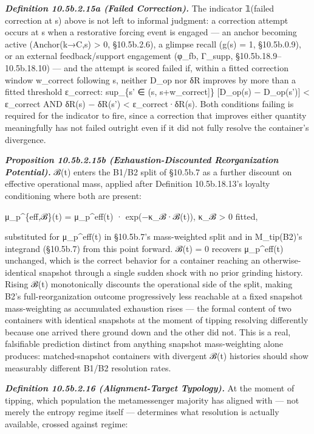 \documentclass[
]{article}
\begin{document}
\emph{\textbf{Definition 10.5b.2.15a (Failed Correction).}} The
indicator 𝟙(failed correction at s) above is not left to informal
judgment: a correction attempt occurs at s when a restorative forcing
event is engaged --- an anchor becoming active (Anchor(k→C,s)
\textgreater{} 0, §10.5b.2.6), a glimpse recall (g(s) = 1, §10.5b.0.9),
or an external feedback/support engagement (φ\_fb, Γ\_supp,
§10.5b.18.9--10.5b.18.10) --- and the attempt is scored failed if,
within a fitted correction window w\_correct following s, neither D\_op
nor δR improves by more than a fitted threshold ε\_correct: sup\_\{s' ∈
(s, s+w\_correct{]}\} {[}D\_op(s) − D\_op(s'){]} \textless{} ε\_correct
AND δR(s) − δR(s') \textless{} ε\_correct·δR(s). Both conditions failing
is required for the indicator to fire, since a correction that improves
either quantity meaningfully has not failed outright even if it did not
fully resolve the container's divergence.

\emph{\textbf{Proposition 10.5b.2.15b (Exhaustion-Discounted
Reorganization Potential).}} ℬ(t) enters the B1/B2 split of §10.5b.7 as
a further discount on effective operational mass, applied after
Definition 10.5b.18.13's loyalty conditioning where both are present:

μ\_p\^{}\{eff,ℬ\}(t) = μ\_p\^{}eff(t) · exp(−κ\_ℬ·ℬ(t)), κ\_ℬ
\textgreater{} 0 fitted,

substituted for μ\_p\^{}eff(t) in §10.5b.7's mass-weighted split and in
M\_tip(B2)'s integrand (§10.5b.7) from this point forward. ℬ(t) = 0
recovers μ\_p\^{}eff(t) unchanged, which is the correct behavior for a
container reaching an otherwise-identical snapshot through a single
sudden shock with no prior grinding history. Rising ℬ(t) monotonically
discounts the operational side of the split, making B2's
full-reorganization outcome progressively less reachable at a fixed
snapshot mass-weighting as accumulated exhaustion rises --- the formal
content of two containers with identical snapshots at the moment of
tipping resolving differently because one arrived there ground down and
the other did not. This is a real, falsifiable prediction distinct from
anything snapshot mass-weighting alone produces: matched-snapshot
containers with divergent ℬ(t) histories should show measurably
different B1/B2 resolution rates.

\emph{\textbf{Definition 10.5b.2.16 (Alignment-Target Typology).}} At
the moment of tipping, which population the metamessenger majority has
aligned with --- not merely the entropy regime itself --- determines
what resolution is actually available, crossed against regime:
\end{document}
